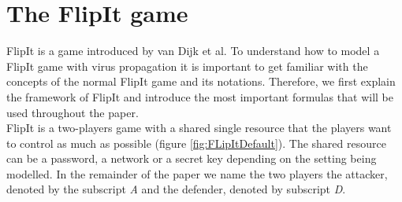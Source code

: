 

%
%
\section{The FlipIt game}
\label{cha1:FlipItGame}
FlipIt is a game introduced by van Dijk et al. To understand how to model a FlipIt game with virus propagation it is important to get familiar with the concepts of the normal FlipIt game and its notations.  Therefore, we first explain the framework of FlipIt and introduce the most important formulas that will be used throughout the paper. \\

FlipIt is a two-players game with a shared single resource that the players want to control as much as possible (figure \ref{fig:FLipItDefault}). The shared resource can be a password, a network or a secret key depending on the setting being modelled. In the remainder of the paper we name the two players the attacker, denoted by the subscript \textit{A} and the defender, denoted by subscript \textit{D}. 

